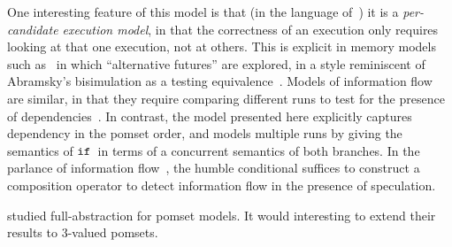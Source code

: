 
One interesting feature of this model is that (in the language
of~\cite{Pichon-Pharabod:2016:CSR:2837614.2837616}) it is a
\emph{per-candidate execution model}, in that the correctness of an
execution only requires looking at that one execution, not at
others. This is explicit in memory models such
as~\cite{Jagadeesan:2010:GOS:2175486.2175503,Kang:2017:PSR:3009837.3009850} in which
``alternative futures'' are explored, in a style reminiscent of
Abramsky's bisimulation as a testing equivalence~\cite{ABRAMSKY1987225}. Models of
information flow are similar, in that they require comparing different
runs to test for the presence of dependencies~\cite{Clarkson:2010:HYP:1891823.1891830}. In contrast, the model
presented here explicitly captures dependency in the pomset order, and
models multiple runs by giving the semantics of $\texttt{if}\,$ in terms of a
concurrent semantics of both branches.
In the parlance of information flow~\cite{Barthe:2004:SIF:1009380.1009669},
the humble conditional suffices to construct a composition operator to detect information flow  in the presence of speculation.

\citet{Plotkin:1997:TSP:266557.266600} studied full-abstraction for pomset
models.  It would interesting to extend their results to 3-valued pomsets.
